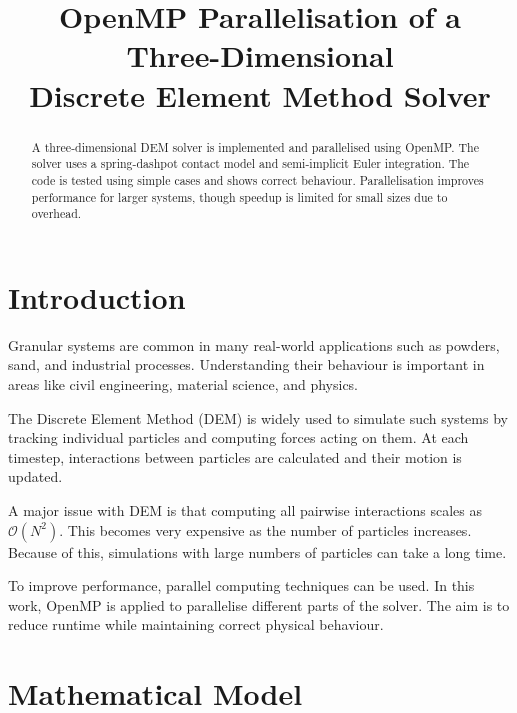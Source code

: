\documentclass[conference]{IEEEtran}
\begin{document}
\title{OpenMP Parallelisation of a Three-Dimensional\\
Discrete Element Method Solver}

\author{
}

\maketitle

\begin{abstract}
A three-dimensional DEM solver is implemented and parallelised using OpenMP.
The solver uses a spring-dashpot contact model and semi-implicit Euler
integration. The code is tested using simple cases and shows correct behaviour.
Parallelisation improves performance for larger systems, though speedup is limited
for small sizes due to overhead.
\end{abstract}

\section{Introduction}

Granular systems are common in many real-world applications such as powders,
sand, and industrial processes. Understanding their behaviour is important
in areas like civil engineering, material science, and physics.

The Discrete Element Method (DEM) is widely used to simulate such systems by
tracking individual particles and computing forces acting on them. At each
timestep, interactions between particles are calculated and their motion is updated.

A major issue with DEM is that computing all pairwise interactions scales as
$\mathcal{O}(N^2)$. This becomes very expensive as the number of particles increases.
Because of this, simulations with large numbers of particles can take a long time.

To improve performance, parallel computing techniques can be used. In this work,
OpenMP is applied to parallelise different parts of the solver. The aim is to
reduce runtime while maintaining correct physical behaviour.

\section{Mathematical Model}
\end{document}
